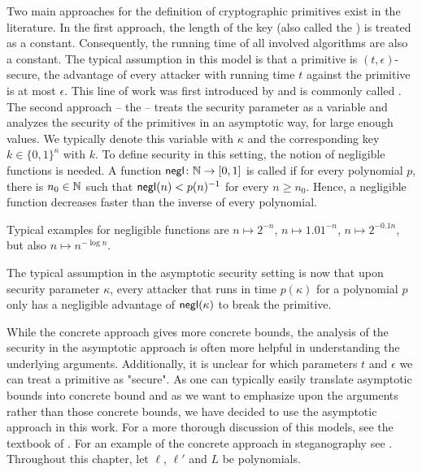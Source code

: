 Two
main approaches for the definition of cryptographic primitives exist in
the literature. In the first approach, the length of the key (also
called the ) is treated as a
constant. Consequently, the running time of all involved algorithms are
also a constant. The typical assumption in this model is that a
primitive is $(t,\epsilon)$-secure, \ie the advantage of every attacker 
with running time $t$ against the primitive is at most $\epsilon$. This
line of work was first introduced by \citeauthor{bellare1997concrete}
and is commonly called 
\cite{bellare1997concrete}. 
 The second approach -- the  -- treats the security parameter as a variable and analyzes
the security of the primitives in an asymptotic way, \ie for large
enough values. We typically denote this variable with $\kappa$ and the
corresponding key $k\in \{0,1\}^{\kappa}$ with $k$.
To define security in this setting, the notion of
negligible functions is needed. A function $\operatorname{\mathsf{negl}}\colon \mathbb{N}\to [0,1]$
is called  if for every polynomial $p$, there is
$n_{0}\in \mathbb{N}$ such that $\operatorname{\mathsf{negl}}(n) < p(n)^{-1}$ for every
$n\geq n_{0}$. Hence, a negligible function decreases faster than the
inverse of every polynomial. 
\begin{example}
  Typical examples for negligible functions are $n\mapsto 2^{-n}$,
  $n\mapsto 1{.}01^{-n}$,  $n\mapsto 2^{-0{.}1n}$, but also $n\mapsto
  n^{-\log n}$. 
\end{example}
The typical assumption in the asymptotic security setting is now that
upon security parameter $\kappa$, every attacker that runs in time $p(\kappa)$ for
a polynomial $p$ only has a negligible advantage of $\operatorname{\mathsf{negl}}(\kappa)$ to break the
primitive. 

While the concrete approach gives more concrete bounds, the analysis of
the security in the asymptotic approach is often more helpful in
understanding the underlying arguments. Additionally, it is unclear for
which parameters $t$ and $\epsilon$ we can treat a primitive as
"secure". As one can typically easily translate asymptotic bounds into
concrete bound and as we want to emphasize upon the arguments rather
than those concrete bounds, we have decided to use the asymptotic
approach in this work. For a more thorough discussion of this models,
see the textbook of \citeauthor{lindell2007introduction}
\cite[pp. 49-52]{lindell2007introduction}.  For an example of the
concrete approach in steganography see \eg
\cite{berndt2016pattern}. Throughout this chapter, let $\ell$, $\ell'$
and $L$ be polynomials.

